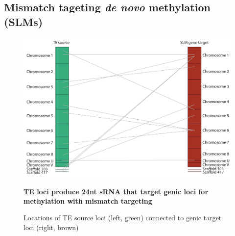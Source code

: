 \subsection{Mismatch tageting \textit{de novo} methylation (SLMs)}

\begin{figure}[htbp!] 
\centering    
    \includegraphics[width=1\textwidth]{Chapter3/Figs/Figure10_SLM_source_target.pdf}
\caption{\textbf{TE loci produce 24nt sRNA that target genic loci for methylation with mismatch targeting}}
\label{fig:SLM_targeting}
\captionsetup{font=small}
    \caption*{Locations of TE source loci (left, green) connected to genic target loci (right, brown)}
\end{figure}

